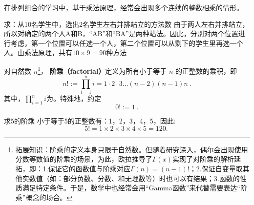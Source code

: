 
\begin{issues}
\issueDraft
\end{issues}


在排列组合的学习中，基于乘法原理，经常会出现多个连续的整数相乘的情形。

\begin{example}{求：从10名学生中，选出2名学生左右并排站立的方法数}
由于两人左右并排站立，所以对确定的两个人A和B，“AB”和“BA”是两种站法。因此，分别对两个位置进行考虑，第一个位置可以任选一个人，第二个位置可以从剩下的学生里再选一个人。由乘法原理，共有$10\times9=90$种方法

\end{example}

对自然数 $n$\footnote{拓展知识：阶乘的定义本身只限于自然数。但随着研究深入，偶尔会出现使用分数等数值的阶乘的场景，为此，欧拉推导了$\Gamma(x)$实现了对阶乘的解析延拓，即：1.保证它的函数值与阶乘对应$\Gamma(n)=(n-1)!$；2.保证自变量取其他实数值（如：部分负数、分数、和无理数等）时也可以有结果；3.函数的性质满足特定条件。于是，数学中也经常会用“Gamma函数”来代替需要表达“阶乘”概念的场合。}， \textbf{阶乘（factorial）}定义为所有小于等于 $n$ 的正整数的乘积，即
\begin{equation}
n! := \prod_{i = 1}^n i =1 \cdot 2 \cdot 3 \dots (n - 2) (n - 1)n~.
\end{equation}
其中，$\prod_{i = 1}^n i$为。特殊地，约定
\begin{equation}
0! := 1~.
\end{equation}

\begin{example}{求5的阶乘}
小于等于5的正整数有：1，2，3，4，5，因此:
$$5! = 1\times 2\times 3\times 4\times 5 = 120.~$$
\end{example}

